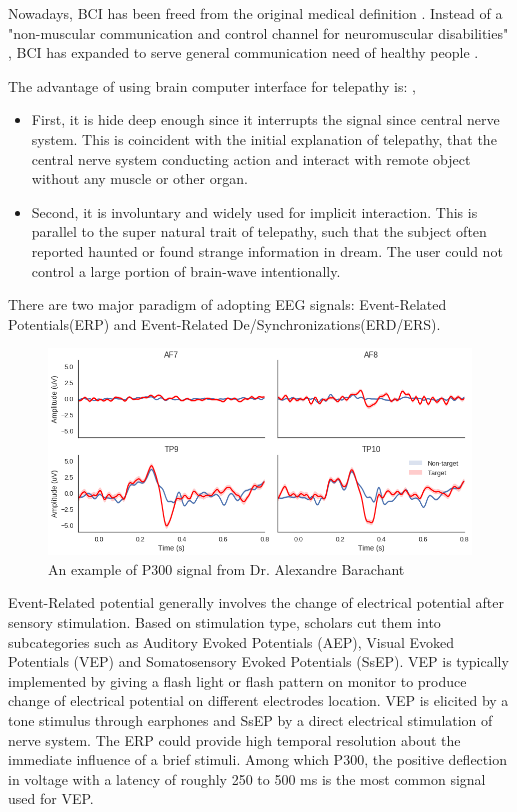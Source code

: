 \documentclass[a4paper]{article}
\begin{document}
Nowadays, BCI has been freed from the original medical definition \autocite{RN37}. Instead of a "non-muscular communication and control channel for neuromuscular disabilities" \autocite{RN46}, BCI has expanded to serve general communication need of healthy people \autocite{RN37}. 

The advantage of using brain computer interface for telepathy is: ,

\begin{itemize}
\item First, it is hide deep enough since it interrupts the signal since central nerve system. This is coincident with the initial explanation of telepathy, that the central nerve system conducting action and interact with remote object without any muscle or other organ.
\item Second, it is involuntary and widely used for implicit interaction. This is parallel to the super natural trait of telepathy, such that the subject often reported haunted or found strange information in dream. The user could not control a large portion of brain-wave intentionally.
\end{itemize}

There are two major paradigm of adopting EEG signals: Event-Related Potentials(ERP) and Event-Related De/Synchronizations(ERD/ERS).\autocite{alarcao2017emotions}

\begin{figure}
	\centering
	\includegraphics[width= 0.8\linewidth]{P300}
	\caption{An example of P300 signal from Dr. Alexandre Barachant}
	\label{fig:P300}
\end{figure}

Event-Related potential generally involves the change of electrical potential after sensory stimulation. Based on stimulation type, scholars cut them into subcategories such as Auditory Evoked Potentials (AEP), Visual Evoked Potentials (VEP) and Somatosensory Evoked Potentials (SsEP)\autocite{alarcao2017emotions}. VEP is typically implemented by giving a flash light or flash pattern on monitor to produce change of electrical potential on different electrodes location. VEP is elicited by a tone stimulus through earphones and SsEP by a direct electrical stimulation of nerve system. The ERP could provide high temporal resolution about the immediate influence of a brief stimuli. Among which P300, the positive deflection in voltage with a latency of roughly 250 to 500 ms is the most common signal used for VEP. 
\end{document}
